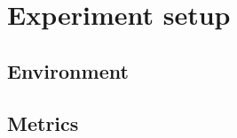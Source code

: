 \thispagestyle{only-cfoot}
\section{Experiment setup}\label{s:ExperimentSetup}



\subsection{Environment}\label{s:ExperimentSetup:Environment}



\subsection{Metrics}\label{s:ExperimentSetup:Metrics}